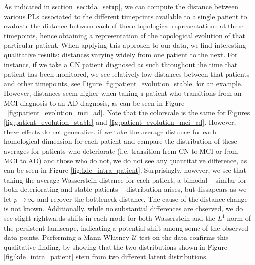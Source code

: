 \documentclass{article}
\begin{document}
As indicated in section \ref{sec:tda_setup}, we can compute the distance between various PLs associated to the different timepoints available to a single patient to evaluate the distance between each of these topological representations at these timepoints, hence obtaining a representation of the topological evolution of that particular patient. When applying this approach to our data, we find interesting qualitative results: distances varying widely from one patient to the next. For instance, if we take a CN patient diagnosed as such throughout the time that patient has been monitored, we see relatively low distances between that patients and other timepoints, see Figure \ref{fig:patient_evolution_stable} for an example. However, distances seem higher when taking a patient who transitions from an MCI diagnosis to an AD diagnosis, as can be seen in Figure ~\ref{fig:patient_evolution_mci_ad}. Note that the colorscale is the same for Figures \ref{fig:patient_evolution_stable} and \ref{fig:patient_evolution_mci_ad}. However, these effects do not generalize: if we take the average distance for each homological dimension for each patient and compare the distribution of these averages for patients who deteriorate (i.e. transition from CN to MCI or from MCI to AD) and those who do not, we do not see any quantitative difference, as can be seen in Figure \ref{fig:kde_intra_patient}. Surprisingly, however, we see that taking the average Wasserstein distance for each patient, a bimodal -- similar for both deteriorating and stable patients -- distribution arises, but dissapears as we let $p\to\infty$ and recover the bottleneck distance. The cause of the distance change is not known. Additionally, while no substantial differences are observed, we do see slight rightwards shifts in each mode for both Wasserstein and the $L^1$ norm of the persistent landscape, indicating a potential shift among some of the observed data points. Performing a Mann-Whitney $\mathcal{U}$ test on the data confirms this qualitative finding, by showing that the two distributions shown in Figure \ref{fig:kde_intra_patient} stem from two different latent distributions.
\end{document}
